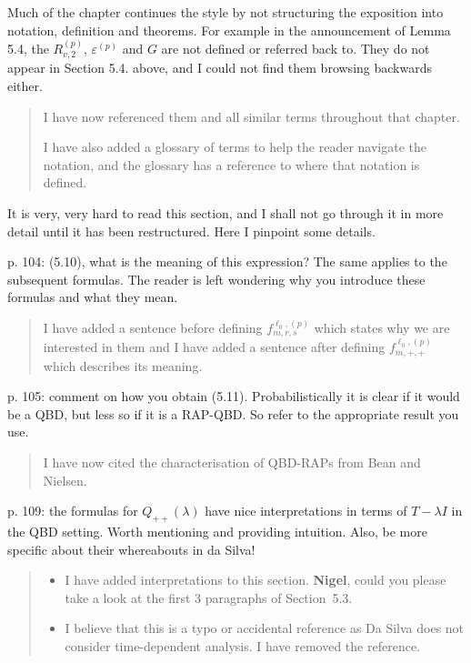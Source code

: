 \documentclass[a4paper]{article}
\begin{document}
Much of the chapter continues the style by not structuring the exposition into notation, definition and theorems. For example in the announcement of Lemma 5.4, the \(R_{v,2}^{(p)}\), \(\varepsilon^{(p)}\) and \(G\) are not defined or referred back to. They do not appear in Section 5.4. above, and I could not find them browsing backwards either.
\begin{quote}
    I have now referenced them and all similar terms throughout that chapter. 

    I have also added a glossary of terms to help the reader navigate the notation, and the glossary has a reference to where that notation is defined. 
\end{quote}

It is very, very hard to read this section, and I shall not go through it in more detail until it has been restructured. Here I pinpoint some details.

p. 104: (5.10), what is the meaning of this expression? The same applies to the subsequent formulas. The reader is left wondering why you introduce these formulas and what they mean.
\begin{quote}
    I have added a sentence before defining \(f_{m,r,s}^{\ell_0,(p)}\) which states why we are interested in them and I have added a sentence after defining \(f_{m,+,+}^{\ell_0,(p)}\) which describes its meaning.
\end{quote}

p. 105: comment on how you obtain (5.11). Probabilistically it is clear if it would be a QBD, but less so if it is a RAP-QBD. So refer to the appropriate result you use. 
\begin{quote}
    I have now cited the characterisation of QBD-RAPs from Bean and Nielsen.
\end{quote}

p. 109: the formulas for \(Q_{++}(\lambda)\) have nice interpretations in terms of \(T -\lambda I\) in the QBD setting. Worth mentioning and providing intuition. Also, be more specific about their whereabouts in da Silva!
\begin{quote}
    \begin{itemize}
        \item I have added interpretations to this section. \textbf{Nigel}, could you please take a look at the first 3 paragraphs of Section~5.3.
        \item I believe that this is a typo or accidental reference as Da Silva does not consider time-dependent analysis. I have removed the reference. 
    \end{itemize}
\end{quote}
\end{document}
